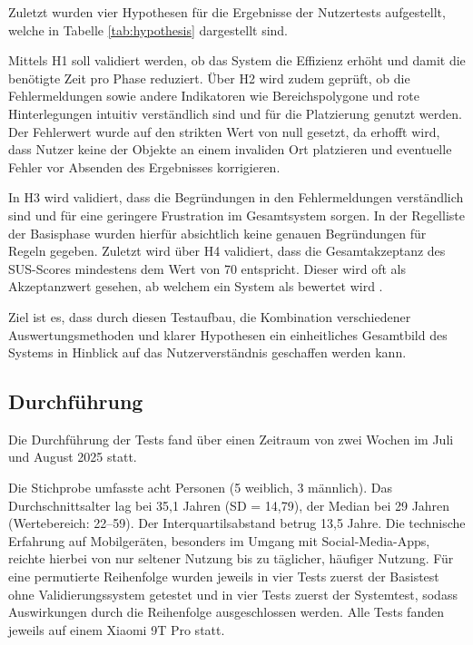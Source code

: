 Zuletzt wurden vier Hypothesen für die Ergebnisse der Nutzertests aufgestellt, welche in Tabelle \ref{tab:hypothesis} dargestellt sind.

Mittels H1 soll validiert werden, ob das System die Effizienz erhöht und damit die benötigte Zeit pro Phase reduziert. Über H2 wird zudem geprüft, ob die Fehlermeldungen sowie andere Indikatoren wie Bereichspolygone und rote Hinterlegungen intuitiv verständlich sind und für die Platzierung genutzt werden. Der Fehlerwert wurde auf den strikten Wert von null gesetzt, da erhofft wird, dass Nutzer keine der Objekte an einem invaliden Ort platzieren und eventuelle Fehler vor Absenden des Ergebnisses korrigieren.

In H3 wird validiert, dass die Begründungen in den Fehlermeldungen verständlich sind und für eine geringere Frustration im Gesamtsystem sorgen. In der Regelliste der Basisphase wurden hierfür absichtlich keine genauen Begründungen für Regeln gegeben. Zuletzt wird über H4 validiert, dass die Gesamtakzeptanz des SUS-Scores mindestens dem Wert von 70 entspricht. Dieser wird oft als Akzeptanzwert gesehen, ab welchem ein System als  bewertet wird \parencite[S. 128]{albertMeasuringUserExperience2022}.

\medskip

Ziel ist es, dass durch diesen Testaufbau, die Kombination verschiedener Auswertungsmethoden und klarer Hypothesen ein einheitliches Gesamtbild des Systems in Hinblick auf das Nutzerverständnis geschaffen werden kann.

\subsection{Durchführung}

Die Durchführung der Tests fand über einen Zeitraum von zwei Wochen im Juli und August 2025 statt.

Die Stichprobe umfasste acht Personen (5 weiblich, 3 männlich). Das Durchschnittsalter lag bei 35,1 Jahren (SD = 14,79), der Median bei 29 Jahren (Wertebereich: 22–59). Der Interquartilsabstand betrug 13,5 Jahre. Die technische Erfahrung auf Mobilgeräten, besonders im Umgang mit Social-Media-Apps, reichte hierbei von nur seltener Nutzung bis zu täglicher, häufiger Nutzung. Für eine permutierte Reihenfolge wurden jeweils in vier Tests zuerst der Basistest ohne Validierungssystem getestet und in vier Tests zuerst der Systemtest, sodass Auswirkungen durch die Reihenfolge ausgeschlossen werden. Alle Tests fanden jeweils auf einem Xiaomi 9T Pro statt.

